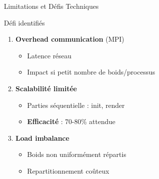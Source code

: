 \documentclass[aspectratio=169]{beamer}
\begin{document}
%     
% 

\begin{frame}{Limitations et Défis Techniques}
    \begin{alertblock}{Défi identifiés}
        \begin{enumerate}
            \item \textbf{Overhead communication} (MPI)
            \begin{itemize}
                \item Latence réseau
                \item Impact si petit nombre de boids/processus
            \end{itemize}
            \item \textbf{Scalabilité limitée}
            \begin{itemize}
                \item Parties séquentielle : init, render
                \item \textbf{Efficacité} : 70-80\% attendue
            \end{itemize}

            \item \textbf{Load imbalance}
            \begin{itemize}
                \item Boids non uniformément répartis
                \item Repartitionnement coûteux
            \end{itemize}
        \end{enumerate}
    \end{alertblock}
\end{frame}
\end{document}
